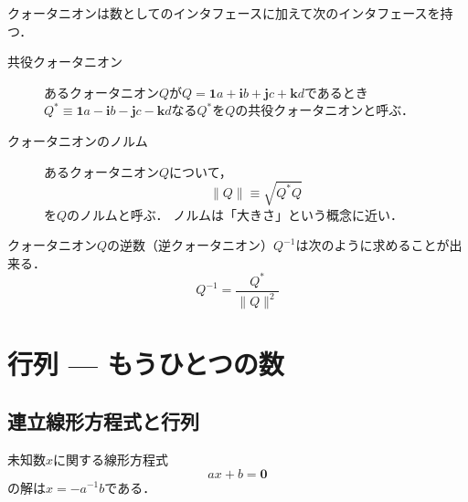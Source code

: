 \documentclass{jsbook}
\newcommand{\zero}{\mathbf{0}}
\newcommand{\one}{\mathbf{1}}
\newcommand{\ii}{\mathbf{i}}
\newcommand{\jj}{\mathbf{j}}
\newcommand{\kk}{\mathbf{k}}
\newcommand{\norm}[1]{\|{#1}\|}
\begin{document}
クォータニオンは数としてのインタフェースに加えて次のインタフェースを持つ．
\begin{description}
\item[共役クォータニオン] あるクォータニオン$Q$が$Q=\one a+\ii b+\jj c+\kk d$であるとき$Q^*\equiv\one a-\ii b-\jj c-\kk d$なる$Q^*$を$Q$の共役クォータニオンと呼ぶ．
\item[クォータニオンのノルム] あるクォータニオン$Q$について，
\begin{equation}\norm{Q}\equiv\sqrt{Q^*Q}
\end{equation}
を$Q$のノルムと呼ぶ．
ノルムは「大きさ」という概念に近い．
\end{description}

クォータニオン$Q$の逆数（逆クォータニオン）$Q^{-1}$は次のように求めることが出来る．
\begin{equation}
Q^{-1}=\frac{Q^*}{\norm{Q}^2}
\end{equation}

\section{行列 --- もうひとつの数}

\subsection{連立線形方程式と行列}

未知数$x$に関する線形方程式
\begin{equation}
ax+b=\zero
\end{equation}
の解は$x=-a^{-1}b$である．
\end{document}
